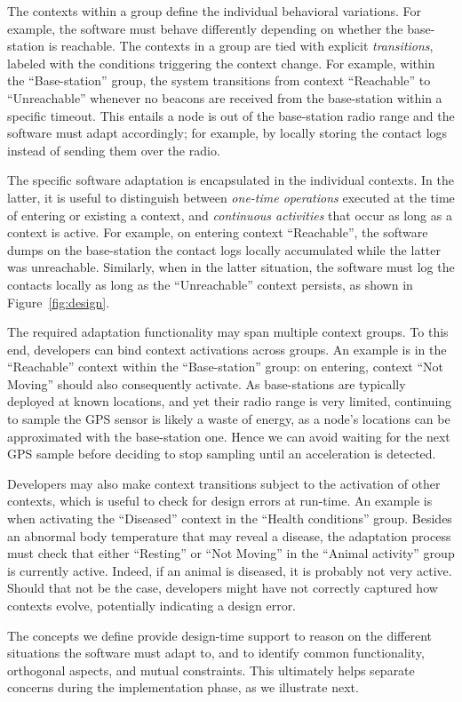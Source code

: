 The contexts within a group define the individual behavioral
variations. For example, the software must behave differently
depending on whether the base-station is reachable.  The contexts in a
group are tied with explicit \emph{transitions}, labeled with the
conditions triggering the context change. For example, within the
``Base-station'' group, the system transitions from context
``Reachable'' to ``Unreachable'' whenever no beacons are received from
the base-station within a specific timeout. This entails a node is out
of the base-station radio range and the software must adapt
accordingly; for example, by locally storing the contact logs instead
of sending them over the radio.

The specific software adaptation is encapsulated in the individual
contexts. In the latter, it is useful to distinguish between \emph{one-time
  operations} executed at the time of entering or existing a context,
and \emph{continuous activities} that occur as long as a context is
active. For example, on entering context ``Reachable'', the software
dumps on the base-station the contact logs locally accumulated while
the latter was unreachable. Similarly, when in the latter situation,
the software must log the contacts locally as long as the
``Unreachable'' context persists, as shown in Figure~\ref{fig:design}.

The required adaptation functionality may span multiple context
groups. To this end, developers can bind context activations across
groups. An example is in the ``Reachable'' context within the
``Base-station'' group: on entering, context ``Not Moving'' should
also consequently activate. As base-stations are typically deployed at
known locations, and yet their radio range is very limited, continuing
to sample the GPS sensor is likely a waste of energy, as a node's
locations can be approximated with the base-station one. Hence we can
avoid waiting for the next GPS sample before deciding to stop
sampling until an acceleration is detected.

Developers may also make context transitions subject to the activation
of other contexts, which is useful to check for design errors at
run-time. An example is when activating the ``Diseased'' context in
the ``Health conditions'' group. Besides an abnormal body temperature
that may reveal a disease, the adaptation process must check that
either ``Resting'' or ``Not Moving'' in the ``Animal activity'' group
is currently active. Indeed, if an animal is diseased, it is probably
not very active. Should that not be the case, developers might have
not correctly captured how contexts evolve, potentially indicating a
design error.

The concepts we define provide design-time support to reason on the
different situations the software must adapt to, and to identify common
functionality, orthogonal aspects, and mutual constraints. This
ultimately helps separate concerns during the implementation phase, as
we illustrate next.



